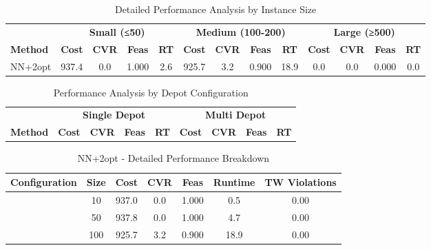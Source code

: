 
\begin{table}[ht]
\centering
\caption{Detailed Performance Analysis by Instance Size}
\label{tab:detailed_size_performance}
\begin{tabular}{lcccccccccccc}
\toprule
& \multicolumn{4}{c}{\textbf{Small (≤50)}} & \multicolumn{4}{c}{\textbf{Medium (100-200)}} & \multicolumn{4}{c}{\textbf{Large (≥500)}} \\
\cmidrule(r){2-5} \cmidrule(r){6-9} \cmidrule(l){10-13}
\textbf{Method} & \textbf{Cost} & \textbf{CVR} & \textbf{Feas} & \textbf{RT} & \textbf{Cost} & \textbf{CVR} & \textbf{Feas} & \textbf{RT} & \textbf{Cost} & \textbf{CVR} & \textbf{Feas} & \textbf{RT} \\
\midrule
NN+2opt & 937.4 & 0.0 & 1.000 & 2.6 & 925.7 & 3.2 & 0.900 & 18.9 & 0.0 & 0.0 & 0.000 & 0.0 \\
\bottomrule
\end{tabular}
\end{table}

\begin{table}[ht]
\centering
\caption{Performance Analysis by Depot Configuration}
\label{tab:depot_configuration}
\begin{tabular}{lcccccccc}
\toprule
& \multicolumn{4}{c}{\textbf{Single Depot}} & \multicolumn{4}{c}{\textbf{Multi Depot}} \\
\cmidrule(r){2-5} \cmidrule(l){6-9}
\textbf{Method} & \textbf{Cost} & \textbf{CVR} & \textbf{Feas} & \textbf{RT} & \textbf{Cost} & \textbf{CVR} & \textbf{Feas} & \textbf{RT} \\
\midrule
\bottomrule
\end{tabular}
\end{table}


\begin{table}[ht]
\centering
\caption{NN+2opt - Detailed Performance Breakdown}
\label{tab:nnplus2opt_breakdown}
\begin{tabular}{lcccccc}
\toprule
\textbf{Configuration} & \textbf{Size} & \textbf{Cost} & \textbf{CVR} & \textbf{Feas} & \textbf{Runtime} & \textbf{TW Violations} \\
\midrule
 & 10 & 937.0 & 0.0 & 1.000 & 0.5 & 0.00 \\
 & 50 & 937.8 & 0.0 & 1.000 & 4.7 & 0.00 \\
 & 100 & 925.7 & 3.2 & 0.900 & 18.9 & 0.00 \\
\bottomrule
\end{tabular}
\end{table}

